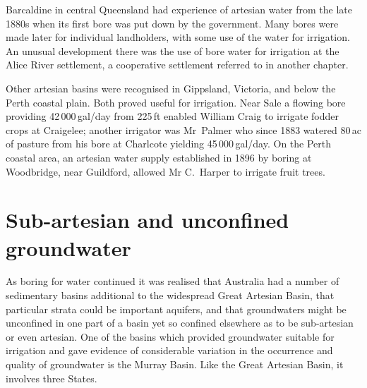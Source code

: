 Barcaldine in central Queensland had experience of artesian water from
the late 1880s when its first bore was put down by the government.
Many bores were made later for individual landholders, with some use
of the water for irrigation.  An unusual development there was the use
of bore water for irrigation at the Alice River settlement, a
cooperative settlement referred to in another chapter.

Other artesian basins were recognised in Gippsland, Victoria, and
below the Perth coastal plain.  Both proved useful for
irrigation. Near Sale a flowing bore providing 42\,000\,gal/day from
225\,ft enabled William Craig to irrigate fodder crops at Craigelee;
another irrigator was Mr~Palmer who since 1883 watered 80\,ac of
pasture from his bore at Charlcote yielding 45\,000\,gal/day. On the
Perth coastal area, an artesian water supply established in 1896 by
boring at Woodbridge, near Guildford, allowed Mr C.~Harper to irrigate
fruit trees.

\section*{Sub-artesian and unconfined groundwater}

As boring for water continued it was realised that Australia had a
number of sedimentary basins additional to the widespread Great
Artesian Basin, that particular strata could be important aquifers,
and that groundwaters might be unconfined in one part of a basin yet
so confined elsewhere as to be sub-artesian or even artesian.  One of
the basins which provided groundwater suitable for irrigation and gave
evidence of considerable variation in the occurrence and quality of
groundwater is the Murray Basin.  Like the Great Artesian Basin, it
involves three States.

